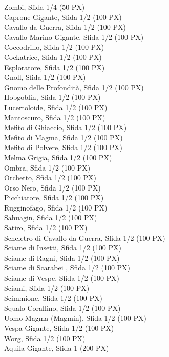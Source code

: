 \begin{multicols}{3}
{Zombi, Sfida 1/4 (50 PX)\\
Caprone Gigante, Sfida 1/2 (100 PX)\\
Cavallo da Guerra, Sfida 1/2 (100 PX)\\
Cavallo Marino Gigante, Sfida 1/2 (100 PX)\\
Coccodrillo, Sfida 1/2 (100 PX)\\
Cockatrice, Sfida 1/2 (100 PX)\\
Esploratore, Sfida 1/2 (100 PX)\\
Gnoll, Sfida 1/2 (100 PX)\\
Gnomo delle Profondità, Sfida 1/2 (100 PX)\\
Hobgoblin, Sfida 1/2 (100 PX)\\
Lucertoloide, Sfida 1/2 (100 PX)\\
Mantoscuro, Sfida 1/2 (100 PX)\\
Mefito di Ghiaccio, Sfida 1/2 (100 PX)\\
Mefito di Magma, Sfida 1/2 (100 PX)\\
Mefito di Polvere, Sfida 1/2 (100 PX)\\
Melma Grigia, Sfida 1/2 (100 PX)\\
Ombra, Sfida 1/2 (100 PX)\\
Orchetto, Sfida 1/2 (100 PX)\\
Orso Nero, Sfida 1/2 (100 PX)\\
Picchiatore, Sfida 1/2 (100 PX)\\
Rugginofago, Sfida 1/2 (100 PX)\\
Sahuagin, Sfida 1/2 (100 PX)\\
Satiro, Sfida 1/2 (100 PX)\\
Scheletro di Cavallo da Guerra, Sfida 1/2 (100 PX)\\
Sciame di Insetti, Sfida 1/2 (100 PX)\\
Sciame di Ragni, Sfida 1/2 (100 PX)\\
Sciame di Scarabei  , Sfida 1/2 (100 PX)\\
Sciame di Vespe, Sfida 1/2 (100 PX)\\
Sciami, Sfida 1/2 (100 PX)\\
Scimmione, Sfida 1/2 (100 PX)\\
Squalo Corallino, Sfida 1/2 (100 PX)\\
Uomo Magma (Magmin), Sfida 1/2 (100 PX)\\
Vespa Gigante, Sfida 1/2 (100 PX)\\
Worg, Sfida 1/2 (100 PX)\\
Aquila Gigante, Sfida 1 (200 PX)\\
}
\end{multicols}
